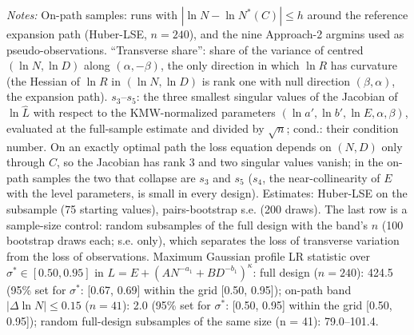 \begin{table}[!htbp]
\begin{threeparttable}
\begin{tablenotes}[flushleft]
\item \textit{Notes:} On-path samples: runs with $|\ln N-\ln N^*(C)|\le h$ around the reference expansion path (Huber-LSE, $n=240$), and the nine Approach-2 argmins used as pseudo-observations. ``Transverse share'': share of the variance of centred $(\ln N,\ln D)$ along $(\alpha,-\beta)$, the only direction in which $\ln R$ has curvature (the Hessian of $\ln R$ in $(\ln N,\ln D)$ is rank one with null direction $(\beta,\alpha)$, the expansion path). $s_3$--$s_5$: the three smallest singular values of the Jacobian of $\ln\hat L$ with respect to the KMW-normalized parameters $(\ln a',\ln b',\ln E,\alpha,\beta)$, evaluated at the full-sample estimate and divided by $\sqrt n$; cond.: their condition number. On an exactly optimal path the loss equation depends on $(N,D)$ only through $C$, so the Jacobian has rank 3 and two singular values vanish; in the on-path samples the two that collapse are $s_3$ and $s_5$ ($s_4$, the near-collinearity of $E$ with the level parameters, is small in every design). Estimates: Huber-LSE on the subsample (75 starting values), pairs-bootstrap s.e. (200 draws). The last row is a sample-size control: random subsamples of the full design with the band's $n$ (100 bootstrap draws each; s.e. only), which separates the loss of transverse variation from the loss of observations. Maximum Gaussian profile LR statistic over $\sigma^*\in[0.50,0.95]$ in $L=E+(AN^{-a_1}+BD^{-b_1})^\kappa$: full design ($n=240$): 424.5 (95\% set for $\sigma^*$: [0.67, 0.69] within the grid [0.50, 0.95]); on-path band $|\Delta\ln N|\le 0.15$ ($n=41$): 2.0 (95\% set for $\sigma^*$: [0.50, 0.95] within the grid [0.50, 0.95]); random full-design subsamples of the same size (n = 41): 79.0--101.4.
\end{tablenotes}
\end{threeparttable}
\end{table}
